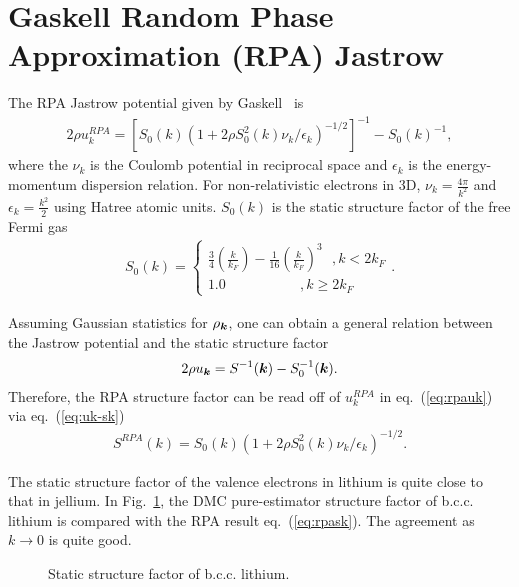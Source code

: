 \section{Gaskell Random Phase Approximation (RPA) Jastrow}
The RPA Jastrow potential given by Gaskell~\cite{Gaskell1961, Ceperley1978, Holzmann2009, Holzmann2016} is
\begin{align}
2\rho u^{RPA}_k = \left[ S_0(k) \left( 1 + 2\rho S_0^2(k) \nu_k/\epsilon_k \right)^{-1/2} \right] ^{-1} - S_0(k)^{-1}, \label{eq:rpauk}
\end{align}
where the $\nu_k$ is the Coulomb potential in reciprocal space and $\epsilon_k$ is the energy-momentum dispersion relation. For non-relativistic electrons in 3D, $\nu_k=\frac{4\pi}{k^2}$ and $\epsilon_k=\frac{k^2}{2}$ using Hatree atomic units. $S_0(k)$ is the static structure factor of the free Fermi gas
\begin{align}
S_0(k) = \left\{\begin{array}{l}
\frac{3}{4}\left( \frac{k}{k_F} \right) - \frac{1}{16}\left(\frac{k}{k_F}\right)^3 ~~~, k<2k_F \\
1.0 ~~~~~~~~~~~~~~~~~~~~~~~~, k \geq 2k_F
\end{array}\right..
\end{align}

Assuming Gaussian statistics for $\rho_{\boldsymbol{k}}$, one can obtain a general relation between the Jastrow potential and the static structure factor~\cite{Holzmann2011} %
\begin{align}
2\rho u_{\boldsymbol{k}} = S^{-1}(\boldsymbol{k}) - S^{-1}_0(\boldsymbol{k}). \label{eq:uk-sk}
\end{align}
Therefore, the RPA structure factor can be read off of $u^{RPA}_k$ in eq.~(\ref{eq:rpauk}) via eq.~(\ref{eq:uk-sk})
\begin{align}
S^{RPA}(k) = S_0(k)\left( 1 + 2\rho S_0^2(k) \nu_k/\epsilon_k \right)^{-1/2}. \label{eq:rpask}
\end{align}

The static structure factor of the valence electrons in lithium is quite close to that in jellium. In Fig.~\ref{fig:rpask}, the DMC pure-estimator structure factor of b.c.c. lithium is compared with the RPA result eq.~(\ref{eq:rpask}). The agreement as $k\rightarrow0$ is quite good.

\begin{figure}[h]
\caption{Static structure factor of b.c.c. lithium.\label{fig:rpask}}
\end{figure}


